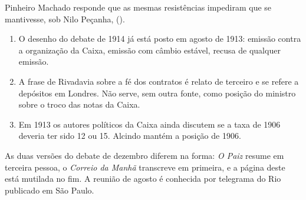 
Pinheiro Machado responde que as mesmas resistências impediram que se
mantivesse, sob Nilo Peçanha,  ().


\begin{enumerate}[leftmargin=*,nosep]
\item O desenho do debate de 1914 já está posto em agosto de 1913: emissão
contra a organização da Caixa, emissão com câmbio estável, recusa de qualquer
emissão.
\item A frase de Rivadavia sobre a fé dos contratos é relato de terceiro e se
refere a depósitos em Londres. Não serve, sem outra fonte, como posição do
ministro sobre o troco das notas da Caixa.
\item Em 1913 os autores políticos da Caixa ainda discutem se a taxa de 1906
deveria ter sido 12 ou 15. Alcindo mantém a posição de 1906.
\end{enumerate}


As duas versões do debate de dezembro diferem na forma: \textit{O Paiz} resume
em terceira pessoa, o \textit{Correio da Manhã} transcreve em primeira, e a
página deste está mutilada no fim. A reunião de agosto é conhecida por telegrama
do Rio publicado em São Paulo.
